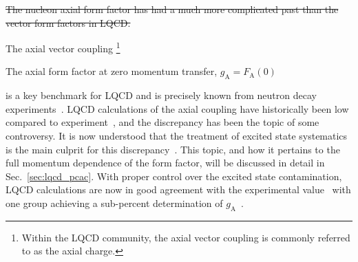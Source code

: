 \documentclass{ar-1col}
\def\asm#1{{\color{blue}#1}}
\def\del#1{}
\begin{document}
\sout{The nucleon axial form factor has had a much more complicated past than the vector form factors in LQCD.}%
\del{
\begin{marginnote}
 \entry{Axial \asm{vector coupling}\del{charge}} {The axial form factor at zero momentum transfer, $g_{\mathrm{A}} = F_{\mathrm{A}}(0)$}
\end{marginnote}%
}
The axial \del{charge}\asm{vector coupling}%
\footnote{Within the LQCD community, the axial vector coupling
 is commonly referred to as the axial charge.}%
\begin{marginnote}
 \entry{Axial \asm{vector coupling}\del{charge}} {The axial form factor at zero momentum transfer, $g_{\mathrm{A}} = F_{\mathrm{A}}(0)$}
\end{marginnote}%
 is a key benchmark for LQCD and is precisely known
from neutron decay experiments~\cite{Dubbers:2021wqv}.
LQCD calculations of the axial \del{charge}\asm{coupling} have historically been low compared to experiment~\cite{Aoki:2021kgd},
 and the discrepancy has been the topic of some controversy.
It is now understood that the treatment of excited state systematics is the main culprit for this discrepancy~\cite{Bar:2017kxh,Ottnad:2020qbw,Aoki:2021kgd}.
\asm{This topic, and how it pertains to the full momentum dependence of the form factor,
 will be discussed in detail in Sec.~\ref{sec:lqcd_pcac}.}
With proper control over the excited state contamination, LQCD calculations are now in good agreement with the experimental value~\cite{Jang:2019vkm,Gupta:2018qil,Alexandrou:2020okk,Abramczyk:2019fnf,Park:2021ypf,RQCD:2019jai,Hasan:2019noy,Djukanovic:2021yqg,Harris:2019bih,Liang:2018pis,Shintani:2018ozy,Ishikawa:2018rew}
 with one group achieving a sub-percent determination of $g_{\mathrm{A}}$~\cite{Chang:2018uxx,Berkowitz:2018gqe,Walker-Loud:2019cif}.
\end{document}
